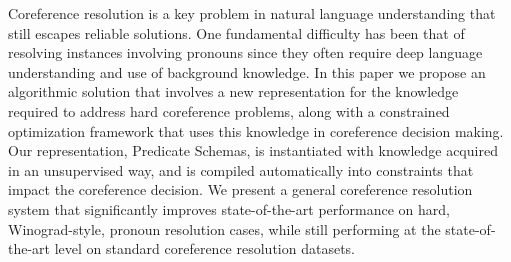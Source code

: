 Coreference resolution is a key problem in natural language understanding that still escapes reliable solutions. One fundamental difficulty has been that of resolving instances involving pronouns since they often require deep language understanding and use of background knowledge. In this paper we propose an algorithmic solution that involves a new representation for the knowledge required to address hard coreference problems, along with a constrained optimization framework that uses this knowledge in coreference decision making. Our representation, Predicate Schemas, is instantiated with knowledge acquired in an unsupervised way, and is compiled automatically into constraints that impact the coreference decision. We present a general coreference resolution system that significantly improves state-of-the-art performance on hard, Winograd-style, pronoun resolution cases, while still performing at the state-of-the-art level on standard coreference resolution datasets.
